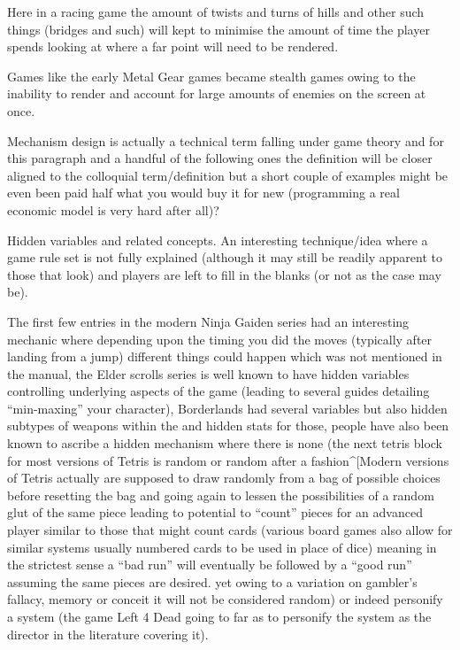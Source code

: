 \documentclass[
]{book}
\begin{document}
Here in a racing game the amount of twists and turns of hills and other such things (bridges and such) will kept to minimise the amount of time the player spends looking at where a far point will need to be rendered.

Games like the early Metal Gear games became stealth games owing to the inability to render and account for large amounts of enemies on the screen at once.

Mechanism design is actually a technical term falling under game theory and for this paragraph and a handful of the following ones the definition will be closer aligned to the colloquial term/definition but a short couple of examples might be even been paid half what you would buy it for new (programming a real economic model is very hard after all)?

Hidden variables and related concepts. An interesting technique/idea where a game rule set is not fully explained (although it may still be readily apparent to those that look) and players are left to fill in the blanks (or not as the case may be).

The first few entries in the modern Ninja Gaiden series had an interesting mechanic where depending upon the timing you did the moves (typically after landing from a jump) different things could happen which was not mentioned in the manual, the Elder scrolls series is well known to have hidden variables controlling underlying aspects of the game (leading to several guides detailing ``min-maxing'' your character), Borderlands had several variables but also hidden subtypes of weapons within the and hidden stats for those, people have also been known to ascribe a hidden mechanism where there is none (the next tetris block for most versions of Tetris is random or random after a fashion\^{}{[}Modern versions of Tetris actually are supposed to draw randomly from a bag of possible choices before resetting the bag and going again to lessen the possibilities of a random glut of the same piece leading to potential to ``count'' pieces for an advanced player similar to those that might count cards (various board games also allow for similar systems usually numbered cards to be used in place of dice) meaning in the strictest sense a ``bad run'' will eventually be followed by a ``good run'' assuming the same pieces are desired. yet owing to a variation on gambler's fallacy, memory or conceit it will not be considered random) or indeed personify a system (the game Left 4 Dead going to far as to personify the system as the director in the literature covering it).
\end{document}
